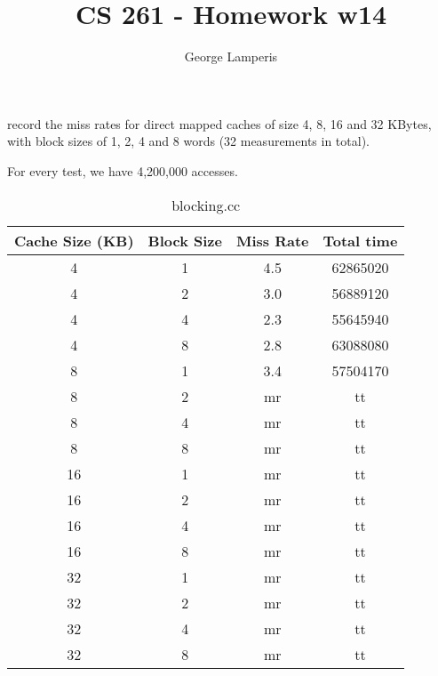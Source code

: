 \documentclass[letterpaper, 12pt, oneside]{memoir}
\title{CS 261 - Homework w14}
\author{George Lamperis}
\date{}
\begin{document}
\maketitle

record the miss rates for direct mapped caches of size 4, 8, 16 and 32 KBytes,
with block sizes of 1, 2, 4 and 8 words (32 measurements in total). 

For every test, we have 4,200,000 accesses.
\begin{table}[H]
\centering
\begin{tabular}{c|c|c|c}
    Cache Size (KB)  & Block Size & Miss Rate & Total time \\ \hline 
    4  & 1 & 4.5    & 62865020 \\
    4  & 2 & 3.0    & 56889120 \\
    4  & 4 & 2.3    & 55645940 \\
    4  & 8 & 2.8    & 63088080 \\ \hline
    8  & 1 & 3.4    & 57504170 \\
    8  & 2 & mr & tt \\
    8  & 4 & mr & tt \\
    8  & 8 & mr & tt \\ \hline
    16 & 1 & mr & tt \\
    16 & 2 & mr & tt \\
    16 & 4 & mr & tt \\
    16 & 8 & mr & tt \\ \hline
    32 & 1 & mr & tt \\
    32 & 2 & mr & tt \\
    32 & 4 & mr & tt \\
    32 & 8 & mr & tt \\
\end{tabular}
\caption{blocking.cc}
\end{table}
\end{document}
